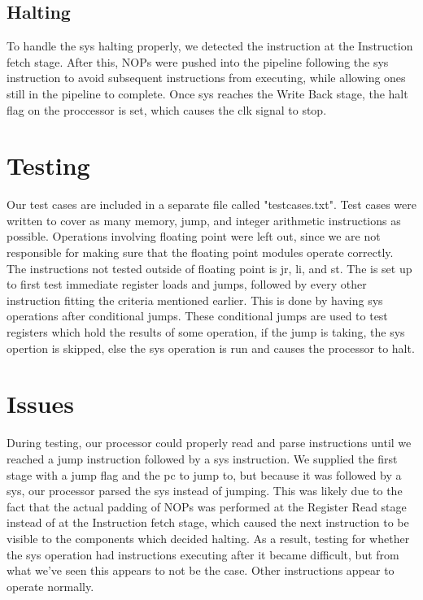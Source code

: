 \documentclass[sigconf]{acmart}
\begin{document}
\subsection{Halting}
To handle the sys halting properly, we detected the instruction at the Instruction fetch stage. After this, NOPs were pushed into the pipeline following the sys instruction to avoid subsequent instructions from executing, while allowing ones still in the pipeline to complete. Once sys reaches the Write Back stage, the halt flag on the proccessor is set, which causes the clk signal to stop. 


\section{Testing}
Our test cases are included in a separate file called "testcases.txt". Test cases were written to cover as many memory, jump, and integer arithmetic instructions as possible. Operations involving floating point were left out, since we are not responsible for making sure that the floating point modules operate correctly. The instructions not tested outside of floating point is jr, li, and st.  The is set up to first test immediate register loads and jumps, followed by every other instruction fitting the criteria mentioned earlier. This is done by having sys operations after conditional jumps. These conditional jumps are used to test registers which hold the results of some operation, if the jump is taking, the sys opertion is skipped, else the sys operation is run and causes the processor to halt.  

\section{Issues}
During testing, our processor could properly read and parse instructions until we reached a jump instruction followed by a sys instruction. We supplied the first stage with a jump flag and the pc to jump to, but because it was followed by a sys, our processor parsed the sys instead of jumping. This was likely due to the fact that the actual padding of NOPs was performed at the Register Read stage instead of at the Instruction fetch stage, which caused the next instruction to be visible to the components which decided halting. As a result, testing for whether the sys operation had instructions executing after it became difficult, but from what we've seen this appears to not be the case. Other instructions appear to operate normally.  
\end{document}
